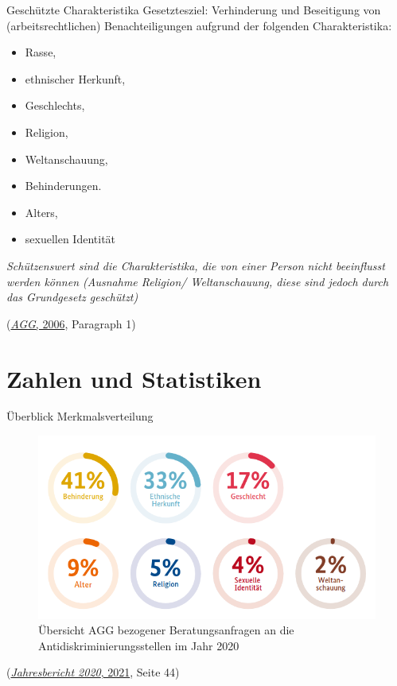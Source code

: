 \documentclass[
  10pt,
  ngerman,
  ignorenonframetext,
]{beamer}
\providecommand{\tightlist}{%
  \setlength{\itemsep}{0pt}\setlength{\parskip}{0pt}}
\begin{document}
\begin{frame}{Geschützte Charakteristika}
\protect\hypertarget{geschuxfctzte-charakteristika}{}
Gesetztesziel: Verhinderung und Beseitigung von (arbeitsrechtlichen)
Benachteiligungen aufgrund der folgenden Charakteristika:

\begin{itemize}
\tightlist
\item
  Rasse,
\item
  ethnischer Herkunft,
\item
  Geschlechts,
\item
  Religion,
\item
  Weltanschauung,
\item
  Behinderungen.
\item
  Alters,
\item
  sexuellen Identität
\end{itemize}

\emph{Schützenswert sind die Charakteristika, die von einer Person nicht
beeinflusst werden können (Ausnahme Religion/ Weltanschauung, diese sind
jedoch durch das Grundgesetz geschützt)}

(\protect\hyperlink{ref-agg}{\emph{AGG}, 2006}, Paragraph 1)
\end{frame}

\hypertarget{zahlen-und-statistiken}{%
\section{Zahlen und Statistiken}\label{zahlen-und-statistiken}}

\begin{frame}{Überblick Merkmalsverteilung}
\protect\hypertarget{uxfcberblick-merkmalsverteilung}{}
\begin{figure}
\centering
\includegraphics[width=\textwidth,height=0.4\textheight]{plots/verteilung_merkmale_s44.png}
\caption{Übersicht AGG bezogener Beratungsanfragen an die
Antidiskriminierungsstellen im Jahr 2020}
\end{figure}

(\protect\hyperlink{ref-jb2020}{\emph{Jahresbericht 2020}, 2021}, Seite
44)
\end{frame}
\end{document}
